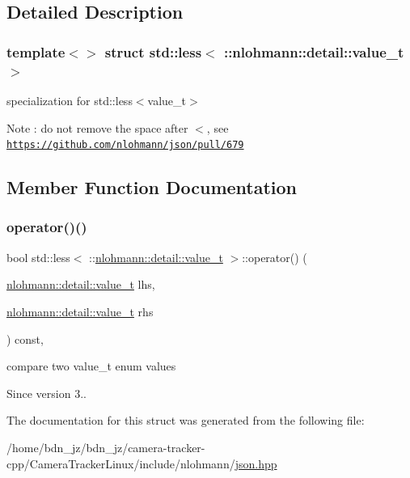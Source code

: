 \subsection{Detailed Description}
\subsubsection*{template$<$$>$\newline
struct std\+::less$<$ \+::nlohmann\+::detail\+::value\+\_\+t $>$}

specialization for std\+::less$<$value\+\_\+t$>$ \begin{DoxyNote}{Note}
\+: do not remove the space after \textquotesingle{}$<$\textquotesingle{}, see \href{https://github.com/nlohmann/json/pull/679}{\tt https\+://github.\+com/nlohmann/json/pull/679} 
\end{DoxyNote}


\subsection{Member Function Documentation}
\mbox{\label{structstd_1_1less_3_01_1_1nlohmann_1_1detail_1_1value__t_01_4_a76d2a6c170cfd74f3b1882be1b5a6671}} 
\subsubsection{\texorpdfstring{operator()()}{operator()()}}
{\footnotesize\ttfamily bool std\+::less$<$ \+::\hyperlink{namespacenlohmann_1_1detail_a1ed8fc6239da25abcaf681d30ace4985}{nlohmann\+::detail\+::value\+\_\+t} $>$\+::operator() (\begin{DoxyParamCaption}\item[{\hyperlink{namespacenlohmann_1_1detail_a1ed8fc6239da25abcaf681d30ace4985}{nlohmann\+::detail\+::value\+\_\+t}}]{lhs,  }\item[{\hyperlink{namespacenlohmann_1_1detail_a1ed8fc6239da25abcaf681d30ace4985}{nlohmann\+::detail\+::value\+\_\+t}}]{rhs }\end{DoxyParamCaption}) const\hspace{0.3cm}{\ttfamily [inline]}, {\ttfamily [noexcept]}}



compare two value\+\_\+t enum values 

\begin{DoxySince}{Since}
version 3.. 
\end{DoxySince}


The documentation for this struct was generated from the following file\+:\begin{DoxyCompactItemize}
\item 
/home/bdn\+\_\+jz/bdn\+\_\+jz/camera-\/tracker-\/cpp/\+Camera\+Tracker\+Linux/include/nlohmann/\hyperlink{json_8hpp}{json.\+hpp}\end{DoxyCompactItemize}
